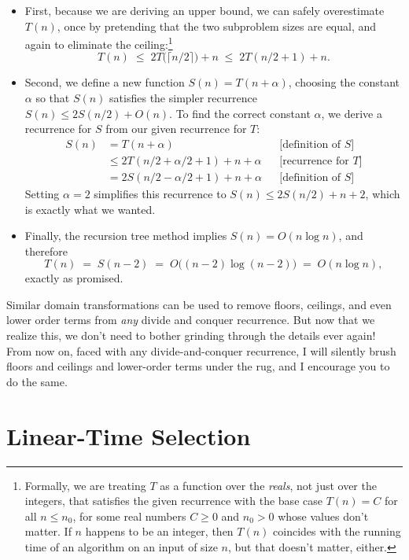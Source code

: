 \begin{itemize}
\item First, because we are deriving an upper bound, we can safely overestimate $T(n)$, once by pretending that the two subproblem sizes are equal, and again to eliminate the ceiling:\footnote{Formally, we are treating $T$ as a function over the \emph{reals}, not just over the integers, that satisfies the given recurrence with the base case $T(n) = C$ for all $n \le n_0$, for some real numbers $C \ge 0$ and $n_0 > 0$ whose values don’t matter. If $n$ happens to be an integer, then $T(n)$ coincides with the running time of an algorithm on an input of size $n$, but that doesn’t matter, either.}
\[
T(n) \;\le\; 2T\bigl(\lceil n/2\rceil\bigr) + n \;\le\; 2T(n/2 + 1) + n.
\]

\item Second, we define a new function $S(n) = T(n + \alpha)$, choosing the constant $\alpha$ so that $S(n)$ satisfies the simpler recurrence $S(n) \le 2S(n/2) + O(n)$. To find the correct constant $\alpha$, we derive a recurrence for $S$ from our given recurrence for $T$:
\begin{align*}
S(n) &= T(n + \alpha) & &\text{[definition of $S$]}\\
&\le 2T(n/2 + \alpha/2 + 1) + n + \alpha & &\text{[recurrence for $T$]}\\
&= 2S(n/2 - \alpha/2 + 1) + n + \alpha & &\text{[definition of $S$]}
\end{align*}
Setting $\alpha = 2$ simplifies this recurrence to $S(n) \le 2S(n/2) + n + 2$, which is exactly what we wanted.

\item Finally, the recursion tree method implies $S(n) = O(n \log n)$, and therefore
\[
T(n) \;=\; S(n-2) \;=\; O\bigl((n-2)\log(n-2)\bigr) \;=\; O(n \log n),
\]
exactly as promised.
\end{itemize}
Similar domain transformations can be used to remove floors, ceilings, and even lower order terms from \emph{any} divide and conquer recurrence. But now that we realize this, we don’t need to bother grinding through the details ever again! From now on, faced with any divide-and-conquer recurrence, I will silently brush floors and ceilings and lower-order terms under the rug, and I encourage you to do the same.

\section{Linear-Time Selection}
\label{sec:1.8}


